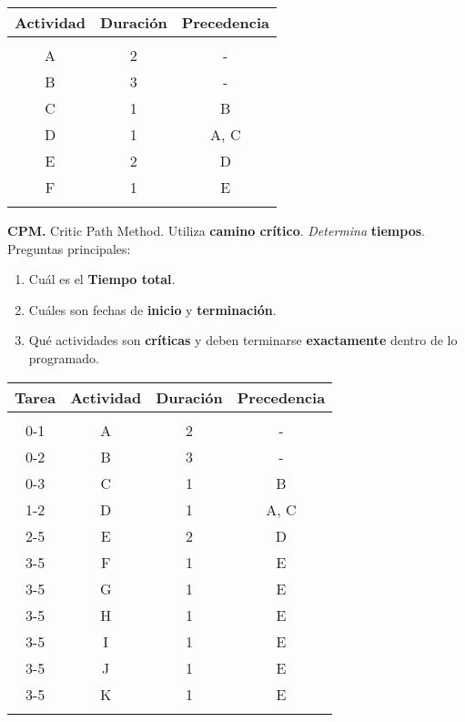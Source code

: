 \documentclass{article}
\begin{document}
\begin{center}
    \begin{tabular}{ c c c }
        Actividad & Duración & Precedencia \\
        \hline                             \\
        A         & 2        & -           \\
        B         & 3        & -           \\
        C         & 1        & B           \\
        D         & 1        & A, C        \\
        E         & 2        & D           \\
        F         & 1        & E           \\
        \hline                             \\
    \end{tabular}
\end{center}

\textbf{CPM.}
Critic Path Method.
Utiliza \textbf{camino crítico}.
\textit{Determina} \textbf{tiempos}.
Preguntas principales:

\begin{enumerate}
    \item Cuál es el \textbf{Tiempo total}.
    \item Cuáles son fechas de \textbf{inicio} y \textbf{terminación}.
    \item Qué actividades son \textbf{críticas} y deben terminarse \textbf{exactamente} dentro de lo programado.
\end{enumerate}

\begin{center}
    \begin{tabular}{ c c c c }
        Tarea & Actividad & Duración & Precedencia \\
        \hline                                     \\
        0-1   & A         & 2        & -           \\
        0-2   & B         & 3        & -           \\
        0-3   & C         & 1        & B           \\
        1-2   & D         & 1        & A, C        \\
        2-5   & E         & 2        & D           \\
        3-5   & F         & 1        & E           \\
        3-5   & G         & 1        & E           \\
        3-5   & H         & 1        & E           \\
        3-5   & I         & 1        & E           \\
        3-5   & J         & 1        & E           \\
        3-5   & K         & 1        & E           \\
        \hline                                     \\
    \end{tabular}
\end{center}
\end{document}
